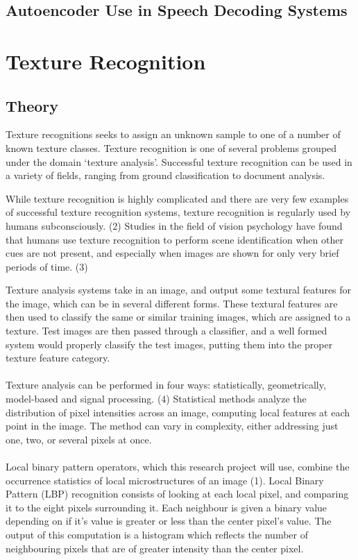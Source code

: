 \documentclass[12pt,twoside]{report}
\begin{document}
		\subsection{Autoencoder Use in Speech Decoding Systems}
	\section{Texture Recognition}
		\subsection{Theory}
Texture recognitions seeks to assign an unknown sample to one of a number of known texture classes. Texture recognition is one of several problems grouped under the domain ‘texture analysis’. Successful texture recognition can be used in a variety of fields, ranging from ground classification to document analysis. 

	While texture recognition is highly complicated and there are very few examples of successful texture recognition systems, texture recognition is regularly used by humans subconsciously. (2)  Studies in the field of vision psychology have found that humans use texture recognition to perform scene identification when other cues are not present, and especially when images are shown for only very brief periods of time. (3)

	Texture analysis systems take in an image, and output some textural features for the image, which can be in several different forms. These textural features are then used to classify the same or similar training images, which are assigned to a texture. Test images are then passed through a classifier, and a well formed system would properly classify the test images, putting them into the proper texture feature category.
\\ \\
	Texture analysis can be performed in four ways: statistically, geometrically, model-based and signal processing. (4) Statistical methods analyze the distribution of pixel intensities across an image, computing local features at each point in the image. The method can vary in complexity, either addressing just one, two, or several pixels at once. 
\\ \\
Local binary pattern operators, which this research project will use, combine the occurrence statistics of local microstructures of an image (1). Local Binary Pattern (LBP) recognition consists of looking at each local pixel, and comparing it to the eight pixels surrounding it. Each neighbour is given a binary value depending on if it’s value is greater or less than the center pixel’s value. The output of this computation is a histogram which reflects the number of neighbouring pixels that are of greater intensity than the center pixel.
\end{document}
